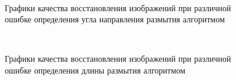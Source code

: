 \begin{figure}[H]
\begin{minipage}[8]{1\linewidth}
 \\ 
\end{minipage}
\caption{ Графики качества восстановления изображений при различной ошибке определения угла направления размытия алгоритмом }
\label{ris:plots_a}
\end{figure}

\begin{figure}[H]
\begin{minipage}[t]{1\linewidth}
  \\ 
\end{minipage}
\caption{ Графики качества восстановления изображений при различной ошибке определения длины размытия алгоритмом }
\label{ris:plots_l}
\end{figure}


